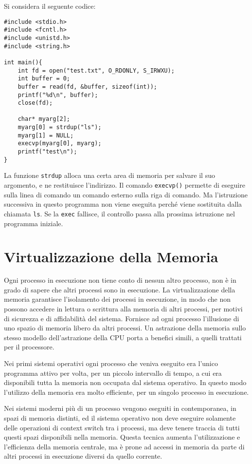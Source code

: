 \documentclass{article}
\numberwithin{equation}{subsection}
\begin{document}
Si considera il seguente codice:

\begin{verbatim}
#include <stdio.h>
#include <fcntl.h>
#include <unistd.h>
#include <string.h>

int main(){
    int fd = open("test.txt", O_RDONLY, S_IRWXU);
    int buffer = 0;
    buffer = read(fd, &buffer, sizeof(int));
    printf("%d\n", buffer);
    close(fd);

    char* myarg[2];
    myarg[0] = strdup("ls");
    myarg[1] = NULL;
    execvp(myarg[0], myarg);
    printf("test\n");
}
\end{verbatim}

La funzione \verb|strdup| alloca una certa area di memoria per salvare il suo argomento, e ne restituisce l'indirizzo. Il comando \verb|execvp()| permette di eseguire 
sulla linea di comando un comando esterno sulla riga di comando. Ma l'istruzione successiva in questo programma non viene eseguita perché viene sostituita dalla 
chiamata \verb|ls|. Se la \verb|exec| fallisce, il controllo passa alla prossima istruzione nel programma iniziale. 

\clearpage

\section{Virtualizzazione della Memoria}

Ogni processo in esecuzione non tiene conto di nessun altro processo, non è in grado di sapere che altri processi sono in esecuzione. 
La virtualizzazione della memoria garantisce l'isolamento dei processi in esecuzione, in modo che non possono accedere in lettura o scrittura alla memoria di altri 
processi, per motivi di sicurezza e di affidabilità del sistema. 
Fornisce ad ogni processo l'illusione di uno spazio di memoria libero da altri processi. Un astrazione della memoria sullo stesso modello dell'astrazione della CPU 
porta a benefici simili, a quelli trattati per il processore. 


Nei primi sistemi operativi ogni processo che veniva eseguito era l'unico programma attivo per volta, per un piccolo intervallo di tempo, a cui era disponibili tutta 
la memoria non occupata dal sistema operativo. In questo modo l'utilizzo della memoria era molto efficiente, per un singolo processo in esecuzione. 


Nei sistemi moderni più di un processo vengono eseguiti 
in contemporanea, in spazi di memoria distinti, ed il sistema operativo non deve eseguire solamente delle operazioni di 
context switch tra i processi, ma deve tenere traccia di tutti questi spazi disponibili nella memoria. 
Questa tecnica aumenta l'utilizzazione e l'efficienza della memoria centrale, ma è prone ad accessi in memoria da parte di altri processi in esecuzione diversi da 
quello corrente. 
\end{document}
